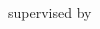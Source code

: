 \begin{titlepage}
	\begin{addmargin}[-1cm]{-3cm}
    \begin{center}
        \large
        \hfill
        \vfill
        \begingroup
            \color{Magenta}\Huge{\myTitle} \\ \bigskip
        		\color{Black}\mySubtitle \\ \bigskip
        \endgroup
				\vfill
        \huge{\myName} \\ \bigskip
				\vfill
        \Large\underline{\myDegree} \\ \bigskip
				\vfill
				\small{supervised by} \\
				\Large{\myProf} \\ \vfill
				\large\myFaculty \\
        \myDepartment \\                            
        \myUni \\ 
				\myLocation \\ \bigskip
				\vfill
				\Large\myTime
    \end{center}  
  \end{addmargin}       
\end{titlepage}   